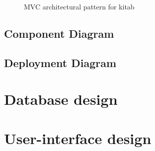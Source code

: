 		\begin{figure}[h]
		\begin{center}

		\caption{MVC architectural pattern for kitab}
		\label{dia_mvc_arch_pattern}

		\end{center}
		\end{figure}

	\subsection{Component Diagram}

	\subsection{Deployment Diagram}

\section{Database design}

\section{User-interface design}